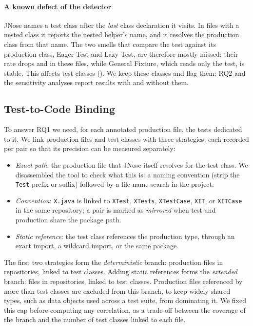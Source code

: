 \paragraph{A known defect of the detector}
JNose names a test class after the \emph{last} class declaration it visits. In files with
a nested class it reports the nested helper's name, and it resolves the production class
from that name. The two smells that compare the test against its production class, Eager
Test and Lazy Test, are therefore mostly missed: their rate drops \FquedaEager{} and
\FquedaLazy{} in these files, while General Fixture, which reads only the test, is stable.
This affects \FclassesAninhadas{} test
classes (\FpctClassesAninhadas{}). We keep these classes and flag them; RQ2 and the
sensitivity analyses report results with and without them.

\subsection{Test-to-Code Binding}
\label{sec:binding}

To answer RQ1 we need, for each annotated production file, the tests dedicated to it. We
link production files and test classes with three strategies, each recorded per pair so
that its precision can be measured separately:

\begin{itemize}
  \item \emph{Exact path}: the production file that JNose itself resolves for the test
  class. We disassembled the tool to check what this is: a naming convention (strip the
  \texttt{Test} prefix or suffix) followed by a file name search in the project.
  \item \emph{Convention}: \texttt{X.java} is linked to \texttt{XTest},
  \texttt{XTests}, \texttt{XTestCase}, \texttt{XIT}, or \texttt{XITCase} in the same
  repository; a pair is marked as \emph{mirrored} when test and production share the
  package path.
  \item \emph{Static reference}: the test class references the production type, through
  an exact import, a wildcard import, or the same package.
\end{itemize}

The first two strategies form the \emph{deterministic} branch: \FarquivosDet{} production
files in \FreposDet{} repositories, linked to \FclassesTesteDet{} test classes. Adding
static references forms the \emph{extended} branch: \FarquivosAmp{} files in
\FreposAmp{} repositories, linked to \FclassesTesteAmp{} test classes. Production files
referenced by more than \FmaxTestes{} test classes are excluded from this branch, to keep
widely shared types, such as data objects used across a test suite, from dominating it.
We fixed this cap before computing any correlation, as a trade-off between the coverage of
the branch and the number of test classes linked to each file.

